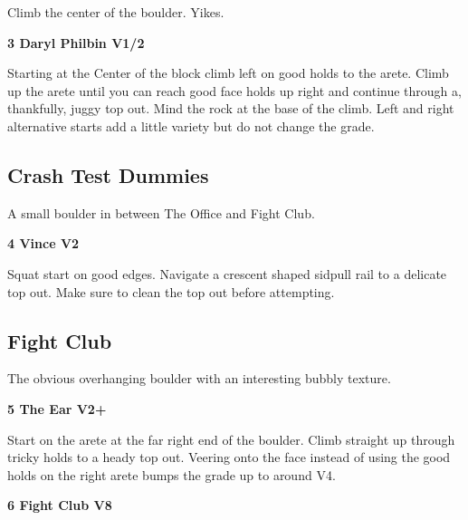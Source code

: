 \begin{multicols}{2}
					\begin{adjustwidth}{0.5cm}{}				
					Climb the center of the boulder. Yikes.
					\end{adjustwidth}

					\label{rt:Daryl Philbin}
\colorbox{green!20}{
\parbox{0.95\linewidth}{
\textbf{
3 Daryl Philbin V1/2  \warn\warn
}
}
}

					\begin{adjustwidth}{0.5cm}{}				
					Starting at the Center of the block climb left on good holds to the arete. Climb up the arete until you can reach good face holds up right and continue through a, thankfully, juggy top out. Mind the rock at the base of the climb. Left and right alternative starts add a little variety but do not change the grade.
					\end{adjustwidth}
			\subsection*{Crash Test Dummies}\label{bf:Crash Test Dummies}
			A small boulder in between The Office and Fight Club.\\
			
					\label{rt:Vince}
\colorbox{green!20}{
\parbox{0.95\linewidth}{
\textbf{
4 Vince V2  
}
}
}

					\begin{adjustwidth}{0.5cm}{}				
					Squat start on good edges. Navigate a crescent shaped sidpull rail to a delicate top out. Make sure to clean the top out before attempting.
					\end{adjustwidth}
			\subsection*{Fight Club}\label{bf:Fight Club}
			The obvious overhanging boulder with an interesting bubbly texture.\\
			

					\label{rt:The Ear}
\colorbox{green!20}{
\parbox{0.95\linewidth}{
\textbf{
5 The Ear V2+  
}
}
}

					\begin{adjustwidth}{0.5cm}{}				
					Start on the arete at the far right end of the boulder. Climb straight up through tricky holds to a heady top out. Veering onto the face instead of using the good holds on the right arete bumps the grade up to around V4.
					\end{adjustwidth}
					\label{rt:Fight Club}
\colorbox{Goldenrod!50}{
\parbox{0.95\linewidth}{
\textbf{
6 Fight Club V8  
}
}
}


\end{multicols}
